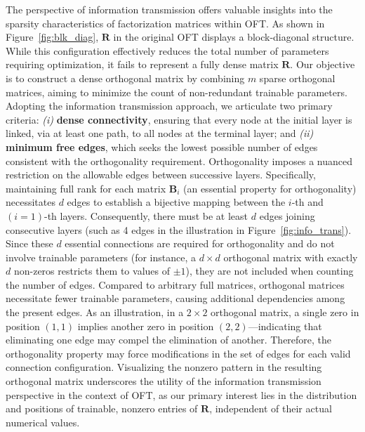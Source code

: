 The perspective of information transmission offers valuable insights into the sparsity characteristics of factorization matrices within OFT. As shown in Figure~\ref{fig:blk_diag}, $\bm{R}$ in the original OFT displays a block-diagonal structure. While this configuration effectively reduces the total number of parameters requiring optimization, it fails to represent a fully dense matrix $\bm{R}$. Our objective is to construct a dense orthogonal matrix by combining $m$ sparse orthogonal matrices, aiming to minimize the count of non-redundant trainable parameters. Adopting the information transmission approach, we articulate two primary criteria: \emph{(i)} \textbf{dense connectivity}, ensuring that every node at the initial layer is linked, via at least one path, to all nodes at the terminal layer; and \emph{(ii)} \textbf{minimum free edges}, which seeks the lowest possible number of edges consistent with the orthogonality requirement. Orthogonality imposes a nuanced restriction on the allowable edges between successive layers. Specifically, maintaining full rank for each matrix $\bm{B}_i$ (an essential property for orthogonality) necessitates $d$ edges to establish a bijective mapping between the $i$-th and $(i=1)$-th layers. Consequently, there must be at least $d$ edges joining consecutive layers (such as 4 edges in the illustration in Figure~\ref{fig:info_trans}). Since these $d$ essential connections are required for orthogonality and do not involve trainable parameters (for instance, a $d\times d$ orthogonal matrix with exactly $d$ non-zeros restricts them to values of $\pm 1$), they are not included when counting the number of edges. Compared to arbitrary full matrices, orthogonal matrices necessitate fewer trainable parameters, causing additional dependencies among the present edges. As an illustration, in a $2\times 2$ orthogonal matrix, a single zero in position $(1,1)$ implies another zero in position $(2,2)$—indicating that eliminating one edge may compel the elimination of another. Therefore, the orthogonality property may force modifications in the set of edges for each valid connection configuration. Visualizing the nonzero pattern in the resulting orthogonal matrix underscores the utility of the information transmission perspective in the context of OFT, as our primary interest lies in the distribution and positions of trainable, nonzero entries of $\bm{R}$, independent of their actual numerical values.

